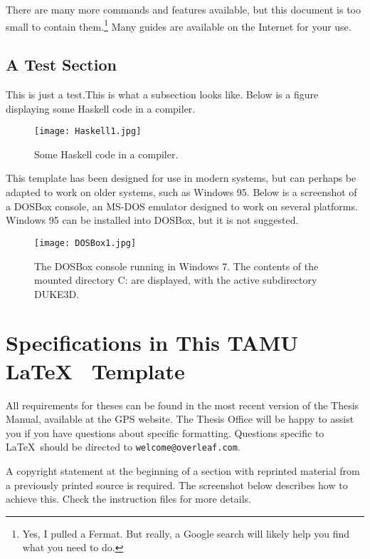 There are many more commands and features available, but this document is too small to contain them.\footnote{Yes, I pulled a Fermat. But really, a Google search will likely help you find what you need to do.} Many guides are available on the Internet for your use.


\subsection{A Test Section}

This is just a test.This is what a subsection looks like. Below is a figure displaying some Haskell code in a compiler.

\begin{figure}[!ht]
\centering
	\texttt{[image: Haskell1.jpg]}
	\caption{Some Haskell code in a compiler.}
\end{figure}

This template has been designed for use in modern systems, but can perhaps be adapted to work on older systems, such as Windows 95. Below is a screenshot of a DOSBox console, an MS-DOS emulator designed to work on several platforms. Windows 95 can be installed into DOSBox, but it is not suggested.

\begin{figure}[ht!]
\centering
	\texttt{[image: DOSBox1.jpg]}
	\caption{The DOSBox console running in Windows 7. The contents of the mounted directory C: are displayed, with the active subdirectory DUKE3D.}
\end{figure}

\section{Specifications in This TAMU \LaTeX ~ Template}

All requirements for theses can be found in the most recent version of the Thesis Manual, available at the GPS website. The Thesis Office will be happy to assist you if you have questions about specific formatting. Questions specific to \LaTeX\ should be directed to \texttt{welcome@overleaf.com}.

 A copyright statement at the beginning of a section with reprinted material from a previously printed source is required. The screenshot below describes how to achieve this. Check the instruction files for more details.

